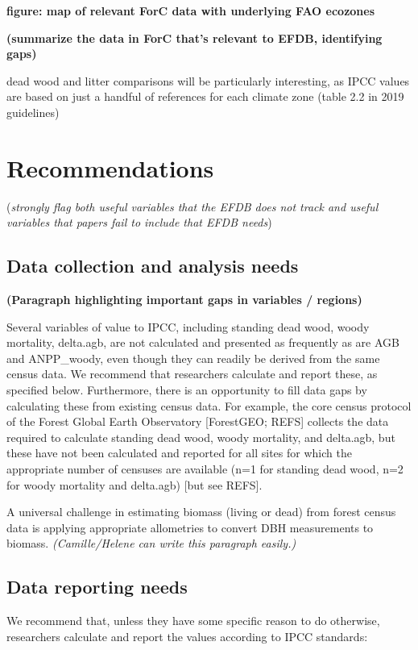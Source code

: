 \documentclass[, manuscript]{copernicus}
\begin{document}
\textbf{figure: map of relevant ForC data with underlying FAO ecozones}

\textbf{(summarize the data in ForC that's relevant to EFDB, identifying
gaps)}

dead wood and litter comparisons will be particularly interesting, as
IPCC values are based on just a handful of references for each climate
zone (table 2.2 in 2019 guidelines)

\section{Recommendations}

(\emph{strongly flag both useful variables that the EFDB does not track
and useful variables that papers fail to include that EFDB needs})

\subsection{Data collection and analysis needs}

\textbf{(Paragraph highlighting important gaps in variables / regions)}

Several variables of value to IPCC, including standing dead wood, woody
mortality, delta.agb, are not calculated and presented as frequently as
are AGB and ANPP\_woody, even though they can readily be derived from
the same census data. We recommend that researchers calculate and report
these, as specified below. Furthermore, there is an opportunity to fill
data gaps by calculating these from existing census data. For example,
the core census protocol of the Forest Global Earth Observatory
{[}ForestGEO; REFS{]} collects the data required to calculate standing
dead wood, woody mortality, and delta.agb, but these have not been
calculated and reported for all sites for which the appropriate number
of censuses are available (n=1 for standing dead wood, n=2 for woody
mortality and delta.agb) {[}but see REFS{]}.

A universal challenge in estimating biomass (living or dead) from forest
census data is applying appropriate allometries to convert DBH
measurements to biomass. \emph{(Camille/Helene can write this paragraph
easily.)}

\subsection{Data reporting needs}

We recommend that, unless they have some specific reason to do
otherwise, researchers calculate and report the values according to IPCC
standards:
\end{document}

